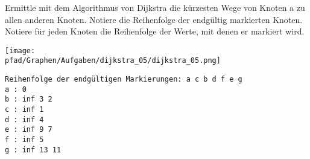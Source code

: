 ﻿\question[4]
Ermittle mit dem Algorithmus von Dijkstra die kürzesten Wege von Knoten a zu allen anderen
Knoten.  Notiere die Reihenfolge der endgültig markierten Knoten.
Notiere für jeden Knoten die Reihenfolge der Werte, mit denen er markiert wird.

\texttt{[image: \\pfad/Graphen/Aufgaben/dijkstra\_05/dijkstra\_05.png]}
\begin{solutionbox}{5cm}
\begin{lstlisting}
Reihenfolge der endgültigen Markierungen: a c b d f e g
a : 0
b : inf 3 2
c : inf 1
d : inf 4
e : inf 9 7
f : inf 5
g : inf 13 11
\end{lstlisting}
\end{solutionbox}
